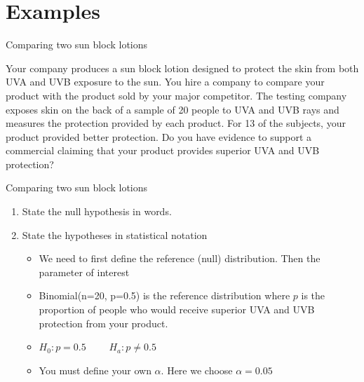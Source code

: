 \documentclass{beamer}\usepackage[]{graphicx}\usepackage[]{color}
\begin{document}
\section{Examples}



\begin{frame}{Comparing two sun block lotions}

\begin{example}
	Your company produces a sun block lotion designed to protect the skin from both UVA and UVB exposure to the sun. You hire a company to compare your product with the product sold by your major competitor. The testing company exposes skin on the back of a sample of 20 people to UVA and UVB rays and measures the protection provided by each product. For 13 of the subjects, your product provided better protection. Do you have evidence to support a commercial claiming that your product provides superior UVA and UVB protection?
\end{example}


\end{frame}



\begin{frame}[fragile]{Comparing two sun block lotions}
\small
\begin{enumerate}
	\setlength\itemsep{1em}
	\item State the null hypothesis in words. \pause
	\item State the hypotheses in statistical notation \pause
	\begin{itemize}
			\setlength\itemsep{.71em}
		\item We need to first define the reference (null) distribution. Then the parameter of interest \pause
		\item Binomial(n=20, p=0.5) is the reference distribution where $p$ is the proportion of people who would receive superior UVA and UVB protection from your product. \pause 
		\item[] $H_0: p = 0.5 \qquad$ $H_a: p \neq 0.5$ \pause
		\item You must define your own $\alpha$. Here we choose $\alpha=0.05$ 		
	\end{itemize}
      
 
\end{enumerate}

\end{frame}
\end{document}
